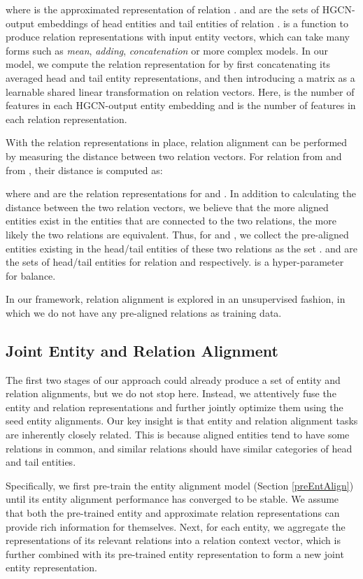 \documentclass[11pt,a4paper]{article}
\begin{document}
where  is the approximated representation of relation .  and  are the sets of HGCN-output embeddings of head
entities and tail entities of relation .  is a function to produce relation representations with input entity vectors, which can
take many forms such as \emph{mean}, \emph{adding}, \emph{concatenation} or more complex models. In our model, we compute
the relation representation for  by first concatenating its averaged head and tail entity representations, and then introducing a matrix
 as a learnable shared linear transformation on relation vectors. Here,  is the number
of features in each HGCN-output entity embedding and  is the number of features in each relation representation.

With the relation representations in place, relation alignment can be performed by measuring the distance between two relation vectors. For relation  from  and  from , their distance is computed as:

where  and  are the relation representations for  and . In addition to calculating the distance between the two relation vectors, we believe that the more aligned entities exist in the entities that are connected to the two relations, the more likely the two relations are equivalent. Thus, for  and , we collect the pre-aligned entities existing in the head/tail entities of these two relations as the set .  and  are the sets of head/tail entities for relation  and  respectively.  is a hyper-parameter for balance.

In our framework, relation alignment is explored in an unsupervised fashion, in which we do not have any pre-aligned relations as training data.

\subsection{Joint Entity and Relation Alignment}
\label{subsection:joint}
The first two stages of our approach could already produce a set of entity and relation alignments, but we do not stop here.
Instead, we attentively fuse the entity and relation representations and further jointly optimize them using the seed entity alignments.
Our key insight is that entity and relation alignment tasks are
inherently closely related. This is because aligned entities tend to have some relations in common, and similar relations should have
similar categories of head and tail entities.

Specifically, we first pre-train the entity alignment model (Section \ref{preEntAlign}) until its entity alignment performance has converged to be
stable. We assume that both the pre-trained entity and approximate relation representations can provide rich information for themselves.
Next, for each entity, we aggregate the representations of its relevant relations into
a relation context vector, which is further combined
with its pre-trained entity representation to form a new joint entity representation.
\end{document}
